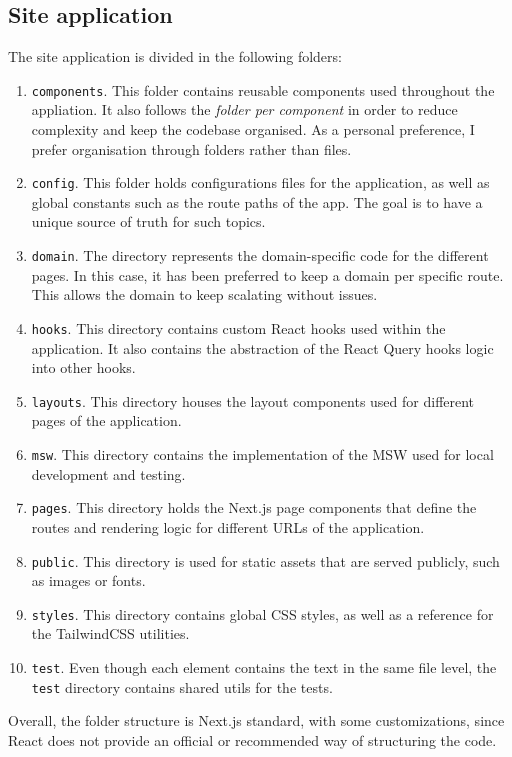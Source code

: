 \documentclass[./memory.tex]{subfiles}
\begin{document}
\subsection{Site application}
The site application is divided in the following folders:
\begin{enumerate}[label = -]
	\item\texttt{components}. This folder contains reusable components used
	throughout the appliation. It also follows the \emph{folder per component}
	in order to reduce complexity and keep the codebase organised. As a personal
	preference, I prefer organisation through folders rather than files.
	\item\texttt{config}. This folder holds configurations files for the
	application, as well as global constants such as the route paths of the app.
	The goal is to have a unique source of truth for such topics.
	\item\texttt{domain}. The directory represents the domain-specific code for
	the different pages. In this case, it has been preferred to keep a
	domain per specific route. This allows the domain to keep scalating
	without issues.
	\item\texttt{hooks}. This directory contains custom React hooks used
	within the application. It also contains the abstraction of the React
	Query hooks logic into other hooks.
	\item\texttt{layouts}. This directory houses the layout components used
	for different pages of the application.
	\item\texttt{msw}. This directory contains the implementation of the MSW used
	for local development and testing.
	\item\texttt{pages}. This directory holds the Next.js page components that
	define the routes and rendering logic for different URLs of the application.
	\item\texttt{public}. This directory is used for static assets that are served
	publicly, such as images or fonts.
	\item\texttt{styles}. This directory contains global CSS styles, as well as a
	reference for the TailwindCSS utilities.
	\item\texttt{test}. Even though each element contains the text in the same
	file level, the \texttt{test} directory contains shared utils for the tests.
\end{enumerate}
Overall, the folder structure is Next.js standard, with some customizations,
since React does not provide an official or recommended way of structuring the
code.
\end{document}
